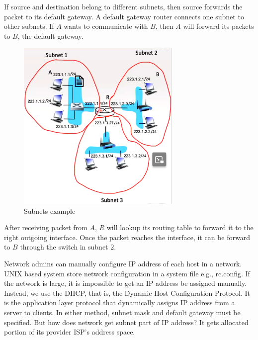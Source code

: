 \documentclass[a4paper]{article}
\theoremstyle{plain}
\theoremstyle{definition}
\newtheorem{defn}{Definition}[section]
\theoremstyle{remark}
\begin{document}
\begin{tcolorbox}[colback=black!3!white,colframe=black!60!white,title=\begin{defn}Default Gateway \label{Default Gateway}\end{defn}]
If source and destination belong to different subnets, then source forwards the packet to its default gateway. A default gateway router connects one subnet to other subnets. If $A$ wants to communicate with $B$, then $A$ will forward its packets to $B$, the default gateway. 
\begin{figure}[H]
	\centering
	\includegraphics[width=0.7\textwidth]{seventyeight.png}
	\caption{Subnets example}
	\label{fig:seventyseven-png}
\end{figure}
After receiving packet from $A$, $R$ will lookup its routing table to forward it to the right outgoing interface. Once the packet reaches the interface, it can be forward to $B$ through the switch in subnet $2$.
\end{tcolorbox}
\begin{tcolorbox}[colback=black!3!white,colframe=black!60!white,title=\begin{defn}How IP addresses are obtained \label{How IP addresses are obtained}\end{defn}]
Network admins can manually configure IP address of each host in a network. UNIX based system store network configuration in a system file e.g., rc.config. If the network is large, it is impossible to get an IP address be assigned manually. Instead, we use the DHCP, that is, the Dynamic Host Configuration Protocol. It is the application layer protocol that dynamically assigns IP address from a server to clients. In either method, subnet mask and default gateway must be specified. But how does network get subnet part of IP address? It gets allocated portion of its provider ISP's address space. 
\end{tcolorbox}
\end{document}
